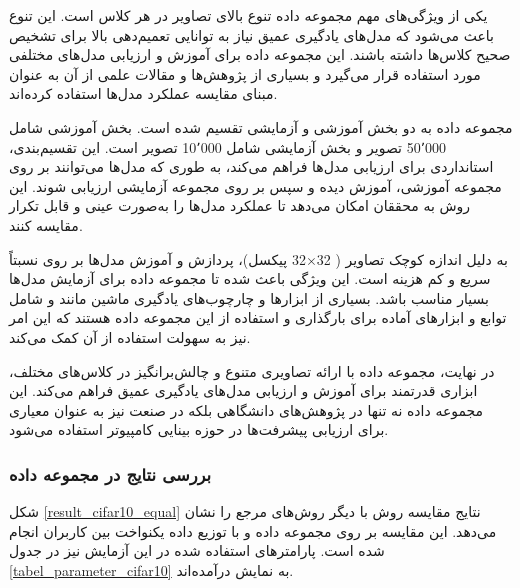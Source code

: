 یکی از ویژگی‌های مهم مجموعه داده
تنوع بالای تصاویر در هر کلاس است. این تنوع باعث می‌شود که مدل‌های یادگیری عمیق نیاز به توانایی تعمیم‌دهی بالا برای تشخیص صحیح کلاس‌ها داشته باشند. این مجموعه داده برای آموزش و ارزیابی مدل‌های مختلفی مورد استفاده قرار می‌گیرد و بسیاری از پژوهش‌ها و مقالات علمی از آن به عنوان مبنای مقایسه عملکرد مدل‌ها استفاده کرده‌اند.

مجموعه داده
به دو بخش آموزشی و آزمایشی تقسیم شده است. بخش آموزشی شامل 50٬000 تصویر و بخش آزمایشی شامل 10٬000 تصویر است. این تقسیم‌بندی، استانداردی برای ارزیابی مدل‌ها فراهم می‌کند، به طوری که مدل‌ها می‌توانند بر روی مجموعه آموزشی، آموزش دیده و سپس بر روی مجموعه آزمایشی ارزیابی شوند. این روش به محققان امکان می‌دهد تا عملکرد مدل‌ها را به‌صورت عینی و قابل تکرار مقایسه کنند.

به دلیل اندازه کوچک تصاویر (%
32$\times$32
پیکسل)، پردازش و آموزش مدل‌ها بر روی
نسبتاً سریع و کم هزینه است. این ویژگی باعث شده تا مجموعه داده 
برای آزمایش مدل‌ها بسیار مناسب باشد. بسیاری از ابزارها و چارچوب‌های%
یادگیری ماشین مانند
و
شامل توابع و ابزارهای آماده برای بارگذاری و استفاده از این مجموعه داده هستند که این امر نیز به سهولت استفاده از آن کمک می‌کند.

در نهایت، مجموعه داده
با ارائه تصاویری متنوع و چالش‌برانگیز در کلاس‌های مختلف، ابزاری قدرتمند برای آموزش و ارزیابی مدل‌های یادگیری عمیق فراهم می‌کند. این مجموعه داده نه تنها در پژوهش‌های دانشگاهی بلکه در صنعت نیز به عنوان معیاری برای ارزیابی پیشرفت‌ها در حوزه بینایی کامپیوتر استفاده می‌شود.


\vspace{3mm}
\subsubsection{
	بررسی نتایج در مجموعه داده
}\vspace{-1mm}


شکل
\ref{result_cifar10_equal}
نتایج مقایسه روش
با دیگر روش‌های مرجع را نشان می‌دهد. این مقایسه بر روی مجموعه داده
و با توزیع داده یکنواخت بین کاربران انجام شده است. پارامترهای استفاده شده در این آزمایش نیز در جدول
\ref{tabel_parameter_cifar10}
به نمایش درآمده‌اند.


